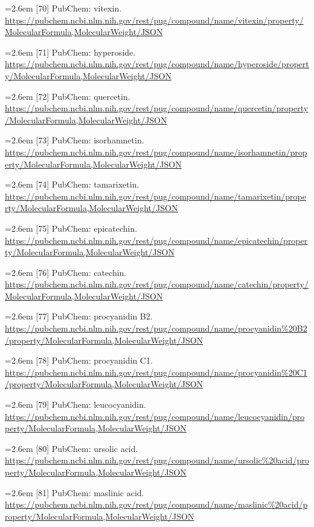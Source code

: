 \documentclass[11pt]{article}
\begin{document}
{\noindent\hangindent=2.6em [70] PubChem: vitexin. \url{https://pubchem.ncbi.nlm.nih.gov/rest/pug/compound/name/vitexin/property/MolecularFormula,MolecularWeight/JSON}\par
\noindent\hangindent=2.6em [71] PubChem: hyperoside. \url{https://pubchem.ncbi.nlm.nih.gov/rest/pug/compound/name/hyperoside/property/MolecularFormula,MolecularWeight/JSON}\par
\noindent\hangindent=2.6em [72] PubChem: quercetin. \url{https://pubchem.ncbi.nlm.nih.gov/rest/pug/compound/name/quercetin/property/MolecularFormula,MolecularWeight/JSON}\par
\noindent\hangindent=2.6em [73] PubChem: isorhamnetin. \url{https://pubchem.ncbi.nlm.nih.gov/rest/pug/compound/name/isorhamnetin/property/MolecularFormula,MolecularWeight/JSON}\par
\noindent\hangindent=2.6em [74] PubChem: tamarixetin. \url{https://pubchem.ncbi.nlm.nih.gov/rest/pug/compound/name/tamarixetin/property/MolecularFormula,MolecularWeight/JSON}\par
\noindent\hangindent=2.6em [75] PubChem: epicatechin. \url{https://pubchem.ncbi.nlm.nih.gov/rest/pug/compound/name/epicatechin/property/MolecularFormula,MolecularWeight/JSON}\par
\noindent\hangindent=2.6em [76] PubChem: catechin. \url{https://pubchem.ncbi.nlm.nih.gov/rest/pug/compound/name/catechin/property/MolecularFormula,MolecularWeight/JSON}\par
\noindent\hangindent=2.6em [77] PubChem: procyanidin B2. \url{https://pubchem.ncbi.nlm.nih.gov/rest/pug/compound/name/procyanidin%20B2/property/MolecularFormula,MolecularWeight/JSON}\par
\noindent\hangindent=2.6em [78] PubChem: procyanidin C1. \url{https://pubchem.ncbi.nlm.nih.gov/rest/pug/compound/name/procyanidin%20C1/property/MolecularFormula,MolecularWeight/JSON}\par
\noindent\hangindent=2.6em [79] PubChem: leucocyanidin. \url{https://pubchem.ncbi.nlm.nih.gov/rest/pug/compound/name/leucocyanidin/property/MolecularFormula,MolecularWeight/JSON}\par
\noindent\hangindent=2.6em [80] PubChem: ursolic acid. \url{https://pubchem.ncbi.nlm.nih.gov/rest/pug/compound/name/ursolic%20acid/property/MolecularFormula,MolecularWeight/JSON}\par
\noindent\hangindent=2.6em [81] PubChem: maslinic acid. \url{https://pubchem.ncbi.nlm.nih.gov/rest/pug/compound/name/maslinic%20acid/property/MolecularFormula,MolecularWeight/JSON}\par
}
\end{document}
